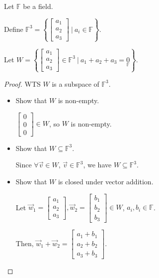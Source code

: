 \documentclass[11pt,fleqn]{book} %
\begin{document}
\begin{example}
    Let $\mathbb{F}$ be a field.

    Define $\mathbb{F}^3 = \left\{ \begin{bmatrix} a_1\\a_2\\a_3 \end{bmatrix} ~|~ a_i \in \mathbb{F} \right\}$.

    Let $W = \left\{ \begin{bmatrix}a_1\\a_2\\a_3\end{bmatrix} \in \mathbb{F}^3 ~|~ a_1+a_2+a_3=\underset{\mathbb{F}}{0} \right\}$.

    \begin{proof}
        WTS $W$ is a subspace of $\mathbb{F}^3$.

        \begin{itemize}
            \item Show that $W$ is non-empty.

            $\begin{bmatrix} 0\\0\\0 \end{bmatrix} \in W$, so $W$ is non-empty.

            \item Show that $W \subseteq \mathbb{F}^3$.

            Since $\forall \vec{v} \in W$, $\vec{v} \in \mathbb{F}^3$, we have $W \subseteq \mathbb{F}^3$.

            \item Show that $W$ is closed under vector addition.

            Let $\vec{w}_1 = \begin{bmatrix}a_1\\a_2\\a_3\end{bmatrix}, \vec{w}_2 = \begin{bmatrix}b_1\\b_2\\b_3\end{bmatrix} \in W$, $a_i,b_i \in \mathbb{F}$.

            Then, $\vec{w}_1 + \vec{w}_2 = \begin{bmatrix}a_1+b_1\\a_2+b_2\\a_3+b_3\end{bmatrix}$.


\end{itemize}
\end{proof}
\end{example}
\end{document}
